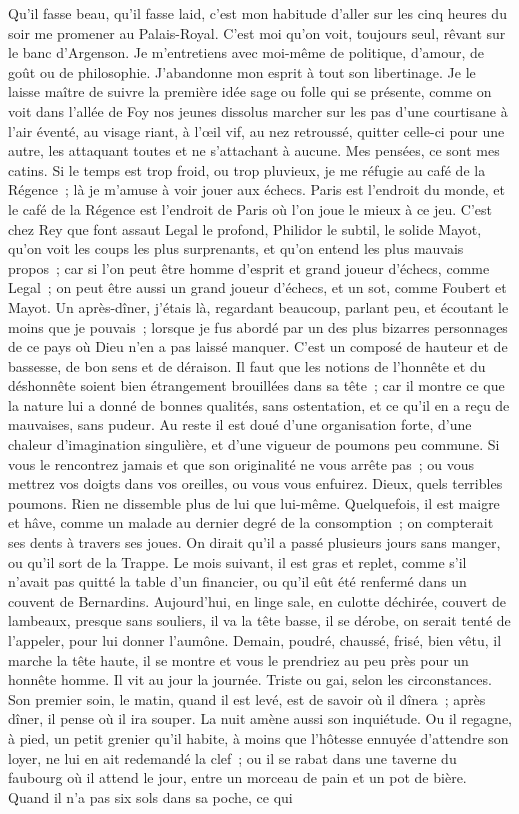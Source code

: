 \documentclass[french,twoside]{book} %
\newcommand{\bibl}[1]{{\RaggedLeft{#1}\par\bigskip}}
\begin{document}
\bibl{(Horat., Lib. II, Satyr. VII)}
\noindent Qu’il fasse beau, qu’il fasse laid, c’est mon habitude d’aller sur les cinq heures du soir me promener au Palais-Royal. C’est moi qu’on voit, toujours seul, rêvant sur le banc d’Argenson. Je m’entretiens avec moi-même de politique, d’amour, de goût ou de philosophie. J’abandonne mon esprit à tout son libertinage. Je le laisse maître de suivre la première idée sage ou folle qui se présente, comme on voit dans l’allée de Foy nos jeunes dissolus marcher sur les pas d’une courtisane à l’air éventé, au visage riant, à l’œil vif, au nez retroussé, quitter celle-ci pour une autre, les attaquant toutes et ne s’attachant à aucune. Mes pensées, ce sont mes catins. Si le temps est trop froid, ou trop pluvieux, je me réfugie au café de la Régence ; là je m’amuse à voir jouer aux échecs. Paris est l’endroit du monde, et le café de la Régence est l’endroit de Paris où l’on joue le mieux à ce jeu. C’est chez Rey que font assaut Legal le profond, Philidor le subtil, le solide Mayot, qu’on voit les coups les plus surprenants, et qu’on entend les plus mauvais propos ; car si l’on peut être homme d’esprit et grand joueur d’échecs, comme Legal ; on peut être aussi un grand joueur d’échecs, et un sot, comme Foubert et Mayot. Un après-dîner, j’étais là, regardant beaucoup, parlant peu, et écoutant le moins que je pouvais ; lorsque je fus abordé par un des plus bizarres personnages de ce pays où Dieu n’en a pas laissé manquer. C’est un composé de hauteur et de bassesse, de bon sens et de déraison. Il faut que les notions de l’honnête et du déshonnête soient bien étrangement brouillées dans sa tête ; car il montre ce que la nature lui a donné de bonnes qualités, sans ostentation, et ce qu’il en a reçu de mauvaises, sans pudeur. Au reste il est doué d’une organisation forte, d’une chaleur d’imagination singulière, et d’une vigueur de poumons peu commune. Si vous le rencontrez jamais et que son originalité ne vous arrête pas ; ou vous mettrez vos doigts dans vos oreilles, ou vous vous enfuirez. Dieux, quels terribles poumons. Rien ne dissemble plus de lui que lui-même. Quelquefois, il est maigre et hâve, comme un malade au dernier degré de la consomption ; on compterait ses dents à travers ses joues. On dirait qu’il a passé plusieurs jours sans manger, ou qu’il sort de la Trappe. Le mois suivant, il est gras et replet, comme s’il n’avait pas quitté la table d’un financier, ou qu’il eût été renfermé dans un couvent de Bernardins. Aujourd’hui, en linge sale, en culotte déchirée, couvert de lambeaux, presque sans souliers, il va la tête basse, il se dérobe, on serait tenté de l’appeler, pour lui donner l’aumône. Demain, poudré, chaussé, frisé, bien vêtu, il marche la tête haute, il se montre et vous le prendriez au peu près pour un honnête homme. Il vit au jour la journée. Triste ou gai, selon les circonstances. Son premier soin, le matin, quand il est levé, est de savoir où il dînera ; après dîner, il pense où il ira souper. La nuit amène aussi son inquiétude. Ou il regagne, à pied, un petit grenier qu’il habite, à moins que l’hôtesse ennuyée d’attendre son loyer, ne lui en ait redemandé la clef ; ou il se rabat dans une taverne du faubourg où il attend le jour, entre un morceau de pain et un pot de bière. Quand il n’a pas six sols dans sa poche, ce qui 
\end{document}
